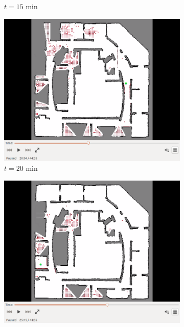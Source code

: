 \documentclass[11pt,professionalfonts,hyperref={pdftex,pdfpagemode=none,pdfstartview=FitH}]{beamer}
\begin{document}
\begin{frame}
\begin{figure}[!ht]
\begin{subfigure}[t]{0.2\columnwidth}
        \caption*{$t=15$ min}
        \label{fig:IRL15min}
    \end{subfigure}
    \begin{subfigure}[t]{0.2\columnwidth}
         \centering
         \includegraphics[trim = {4.6cm 3.8cm 4.6cm 0}, clip, width=\textwidth]{20min.png}
        \caption*{$t=20$ min}
        \label{fig:IRL20min}
    \end{subfigure}
    \begin{subfigure}[t]{0.2\columnwidth}
           \centering
           \includegraphics[trim = {4.6cm 3.8cm 4.6cm 0}, clip, width=\textwidth]{25min.png}

\end{subfigure}
\end{figure}
\end{frame}
\end{document}
